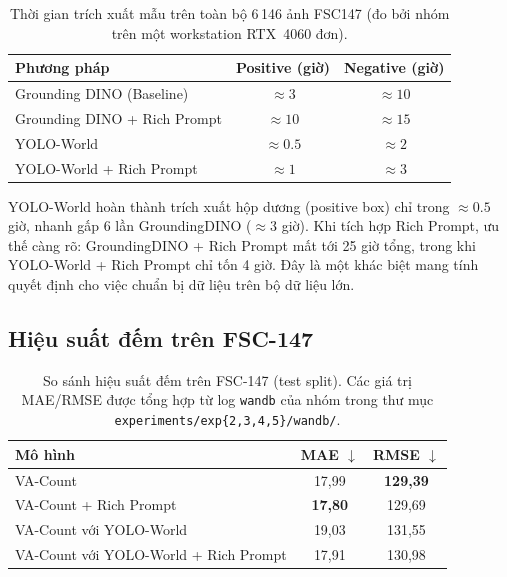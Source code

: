 \documentclass[a4paper,12pt]{report}
\numberwithin{figure}{chapter}
\numberwithin{table}{chapter}
\begin{document}
\begin{table}[H]
\centering
\renewcommand{\arraystretch}{1.2}
\begin{tabular}{|l|c|c|}
\hline
\rowcolor[HTML]{EFEFEF}
\textbf{Phương pháp} & \textbf{Positive (giờ)} & \textbf{Negative (giờ)} \\
\hline
Grounding DINO (Baseline) & $\approx 3$ & $\approx 10$ \\
\hline
Grounding DINO + Rich Prompt & $\approx 10$ & $\approx 15$ \\
\hline
YOLO-World & $\approx 0.5$ & $\approx 2$ \\
\hline
YOLO-World + Rich Prompt & $\approx 1$ & $\approx 3$ \\
\hline
\end{tabular}
\caption{Thời gian trích xuất mẫu trên toàn bộ 6\,146 ảnh FSC147 (đo bởi nhóm trên một workstation RTX~4060 đơn).}
\label{tab:extract_time}
\end{table}

YOLO-World hoàn thành trích xuất hộp dương (positive box) chỉ trong $\approx 0{.}5$ giờ, nhanh gấp 6 lần GroundingDINO ($\approx 3$ giờ). Khi tích hợp Rich Prompt, ưu thế càng rõ: GroundingDINO + Rich Prompt mất tới 25 giờ tổng, trong khi YOLO-World + Rich Prompt chỉ tốn 4 giờ. Đây là một khác biệt mang tính quyết định cho việc chuẩn bị dữ liệu trên bộ dữ liệu lớn.

\subsection{Hiệu suất đếm trên FSC-147}

\begin{table}[H]
\centering
\renewcommand{\arraystretch}{1.2}
\begin{tabular}{|l|c|c|}
\hline
\rowcolor[HTML]{EFEFEF}
\textbf{Mô hình} & \textbf{MAE} $\downarrow$ & \textbf{RMSE} $\downarrow$ \\
\hline
VA-Count & 17,99 & \textbf{129,39} \\
\hline
VA-Count + Rich Prompt & \textbf{17,80} & 129,69 \\
\hline
VA-Count với YOLO-World & 19,03 & 131,55 \\
\hline
VA-Count với YOLO-World + Rich Prompt & 17,91 & 130,98 \\
\hline
\end{tabular}
\caption{So sánh hiệu suất đếm trên FSC-147 (test split). Các giá trị MAE/RMSE được tổng hợp từ log \texttt{wandb} của nhóm trong thư mục \mbox{\texttt{experiments/exp\{2,3,4,5\}/wandb/}}.}
\label{tab:counting_perf}
\end{table}
\end{document}
